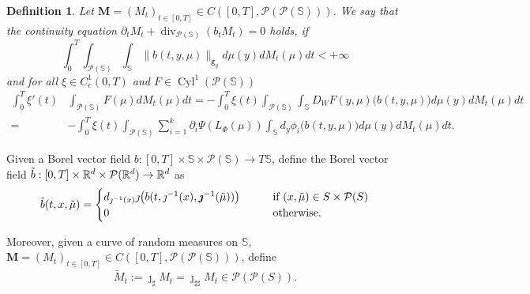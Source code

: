 \documentclass[10pt,leqno]{amsart}
\numberwithin{equation}{section}
\newtheorem{df}[teorema]{Definition}
\newcommand{\R}{\mathbb{R}}
\newcommand{\PP}{\mathcal{P}}
\newcommand{\ttg}{\mathtt{g}}
\newcommand{\Ss}{\mathbb{S}}
\begin{document}
\begin{df}\label{ce manifold rm}
    Let $\boldsymbol{M}=(M_t)_{t\in [0,T]}\in C([0,T],\PP(\PP(\Ss)))$. We say that the continuity equation $\partial_tM_t + \operatorname{div}_{\PP(\Ss)}(b_t M_t) = 0$ holds, if 
    \begin{equation}
        \int_0^T \int_{\PP(\Ss)}\int_\Ss \lVert b(t,y,\mu) \rVert_{\ttg_{y}} d\mu(y) dM_t(\mu)dt <+\infty
    \end{equation}
    and for all $\xi\in C_c^1(0,T)$ and $F \in \operatorname{Cyl}^1(\PP(\Ss))$
    \begin{equation}\label{weak ce manifold rm}
    \begin{aligned}
        \int_0^T \xi'(t) & \int_{\PP(\Ss)} F(\mu) dM_t(\mu) dt =  -\int_0^T \xi(t) \int_{\PP(\Ss)} \int_\Ss D_W F(y,\mu)\big(b(t,y,\mu)\big) d\mu(y) dM_t(\mu) dt 
        \\
        = & -\int_0^T \xi(t) \int_{\PP(\Ss)}  \sum_{i=1}^k \partial_i \Psi(L_\Phi(\mu)) \int_\Ss d_y\phi_i\big(b(t,y,\mu)\big) d\mu(y) dM_t(\mu) dt.
    \end{aligned}
    \end{equation}
\end{df}









Given a Borel vector field $b:[0,T]\times \Ss \times \PP(\Ss) \to T\Ss$, define the Borel vector field $\Tilde{b}:[0,T]\times \R^d \times \PP(\R^d) \to \R^d$ as 
\begin{equation}\label{def of tilde b from b}
\Tilde{b}(t,x,\tilde{\mu}) = 
\begin{cases}
    d_{\jmath^{-1}(x)}\jmath\big( b(t,\jmath^{-1}(x), \boldsymbol{\jmath}^{-1}(\tilde{\mu})) \big) \quad \quad & \text{if } (x,\tilde{\mu})\in S\times \PP(S)
    \\
    0 & \text{otherwise}.
\end{cases}
\end{equation}


Moreover, given a curve of random measures on $\Ss$, $\boldsymbol{M} = (M_t)_{t\in[0,T]} \in C([0,T],\PP(\PP(\Ss)))$, define 
\begin{equation}\label{eq: def of M_t from N_t}
    \tilde{M}_t := \boldsymbol{\jmath}_\sharp M_t = \jmath_{\sharp\sharp} M_t \in \PP(\PP(S)).
\end{equation}
\end{document}
